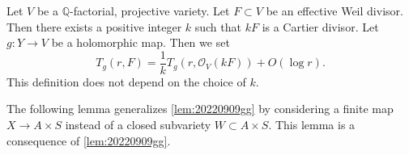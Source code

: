 \documentclass[11pt,english]{smfart}
\theoremstyle{plain}
\theoremstyle{definition}
\theoremstyle{remark}
\numberwithin{equation}{section}
\theoremstyle{plain}
\begin{document}
	
	
	
	
	
	
	
	
	
	
	
	
	
	
	
	
	
	
	
	
	
	
	
	
	Let $V$ be a $\mathbb Q$-factorial, projective variety.
	Let $F\subset V$ be an effective Weil divisor.
	Then there exists a positive integer $k$ such that $kF$ is a Cartier divisor.
	Let $g:Y\to V$ be a holomorphic map.
	Then we set
	$$
	T_g(r,F)=\frac{1}{k}T_g(r,\mathcal{O}_V(kF))+O(\log r).
	$$
	This definition does not depend on the choice of $k$.
	
	
	The following lemma generalizes \cref{lem:20220909gg} by considering a finite map $X\to A\times S$ instead of a closed subvariety $W\subset A\times S$.
	This lemma is a consequence of \cref{lem:20220909gg}.
	
\end{document}
